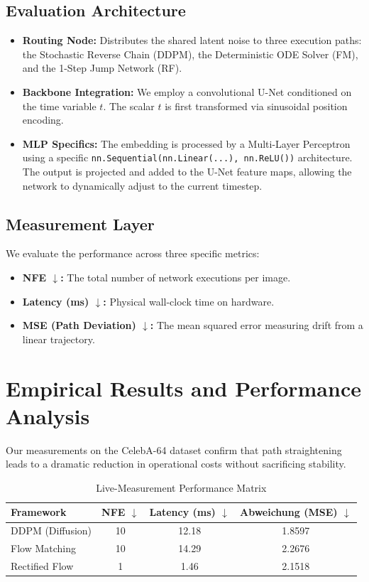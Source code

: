 \documentclass[11pt,a4paper]{article}
\begin{document}
\subsection{Evaluation Architecture}
\begin{itemize}
    \item \textbf{Routing Node:} Distributes the shared latent noise to three execution paths: the Stochastic Reverse Chain (DDPM), the Deterministic ODE Solver (FM), and the 1-Step Jump Network (RF).
    \item \textbf{Backbone Integration:} We employ a convolutional U-Net conditioned on the time variable $t$. The scalar $t$ is first transformed via sinusoidal position encoding.
    \item \textbf{MLP Specifics:} The embedding is processed by a Multi-Layer Perceptron using a specific \texttt{nn.Sequential(nn.Linear(...), nn.ReLU())} architecture. The output is projected and added to the U-Net feature maps, allowing the network to dynamically adjust to the current timestep.
\end{itemize}

\subsection{Measurement Layer}
We evaluate the performance across three specific metrics:
\begin{itemize}
    \item \textbf{NFE $\downarrow$:} The total number of network executions per image.
    \item \textbf{Latency (ms) $\downarrow$:} Physical wall-clock time on hardware.
    \item \textbf{MSE (Path Deviation) $\downarrow$:} The mean squared error measuring drift from a linear trajectory.
\end{itemize}

\section{Empirical Results and Performance Analysis}
Our measurements on the CelebA-64 dataset confirm that path straightening leads to a dramatic reduction in operational costs without sacrificing stability.

\begin{table}[h]
\centering
\caption{Live-Measurement Performance Matrix}
\label{tab:results}
\vspace{0.2cm}
\begin{tabular}{lccc}
\toprule
\textbf{Framework} & \textbf{NFE $\downarrow$} & \textbf{Latency (ms) $\downarrow$} & \textbf{Abweichung (MSE) $\downarrow$} \\
\midrule
DDPM (Diffusion) & 10 & 12.18 & 1.8597 \\
Flow Matching    & 10 & 14.29 & 2.2676 \\
Rectified Flow   & 1  & 1.46  & 2.1518 \\
\bottomrule
\end{tabular}
\end{table}
\end{document}
